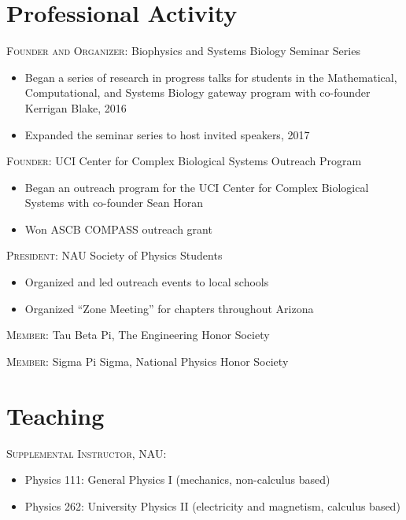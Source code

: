 \documentclass[letterpaper,10pt]{article} %
\begin{document}

\section*{Professional Activity}
\bigskip

\textsc{Founder and Organizer:} Biophysics and Systems Biology Seminar Series
\begin{itemize}
\item Began a series of research in progress talks for students in the Mathematical, Computational, and Systems Biology gateway program with co-founder Kerrigan Blake, 2016
\item Expanded the seminar series to host invited speakers, 2017
\end{itemize}

\textsc{Founder:} UCI Center for Complex Biological Systems Outreach Program
\begin{itemize}
\item Began an outreach program for the UCI Center for Complex Biological Systems with co-founder Sean Horan
\item Won ASCB COMPASS outreach grant
\end{itemize}

\textsc{President:} NAU Society of Physics Students
\begin{itemize}
\item Organized and led outreach events to local schools
\item Organized ``Zone Meeting'' for chapters throughout Arizona
\end{itemize}

\textsc{Member:} Tau Beta Pi, The Engineering Honor Society

\textsc{Member:} Sigma Pi Sigma, National Physics Honor Society


\section*{Teaching}
\bigskip

\textsc{Supplemental Instructor, NAU:}
\begin{itemize}
\item Physics 111: General Physics I (mechanics, non-calculus based)
\item Physics 262: University Physics II (electricity and magnetism, calculus based)
\end{itemize}
\end{document}
